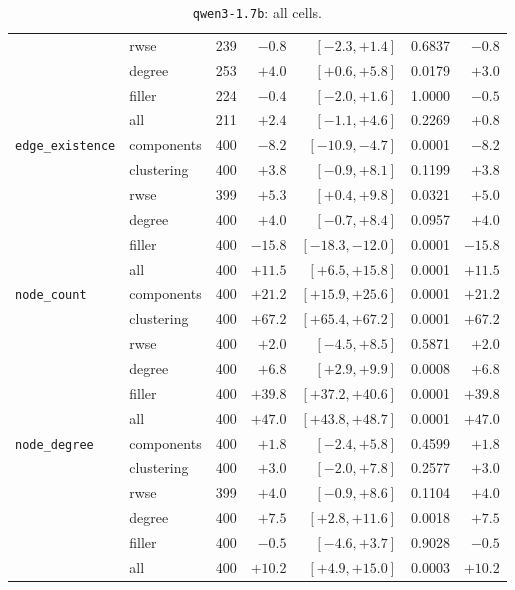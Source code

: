 \begin{table}[H]
{\begin{tabular}{llrrrrr}
 & rwse & 239 & $-0.8$ & $[-2.3, +1.4]$ & 0.6837 & $-0.8$ \\
 & degree & 253 & $+4.0$ & $[+0.6, +5.8]$ & 0.0179 & $+3.0$ \\
 & filler & 224 & $-0.4$ & $[-2.0, +1.6]$ & 1.0000 & $-0.5$ \\
 & all & 211 & $+2.4$ & $[-1.1, +4.6]$ & 0.2269 & $+0.8$ \\
\midrule
\texttt{edge\_existence} & components & 400 & $-8.2$ & $[-10.9, -4.7]$ & 0.0001 & $-8.2$ \\
 & clustering & 400 & $+3.8$ & $[-0.9, +8.1]$ & 0.1199 & $+3.8$ \\
 & rwse & 399 & $+5.3$ & $[+0.4, +9.8]$ & 0.0321 & $+5.0$ \\
 & degree & 400 & $+4.0$ & $[-0.7, +8.4]$ & 0.0957 & $+4.0$ \\
 & filler & 400 & $-15.8$ & $[-18.3, -12.0]$ & 0.0001 & $-15.8$ \\
 & all & 400 & $+11.5$ & $[+6.5, +15.8]$ & 0.0001 & $+11.5$ \\
\midrule
\texttt{node\_count} & components & 400 & $+21.2$ & $[+15.9, +25.6]$ & 0.0001 & $+21.2$ \\
 & clustering & 400 & $+67.2$ & $[+65.4, +67.2]$ & 0.0001 & $+67.2$ \\
 & rwse & 400 & $+2.0$ & $[-4.5, +8.5]$ & 0.5871 & $+2.0$ \\
 & degree & 400 & $+6.8$ & $[+2.9, +9.9]$ & 0.0008 & $+6.8$ \\
 & filler & 400 & $+39.8$ & $[+37.2, +40.6]$ & 0.0001 & $+39.8$ \\
 & all & 400 & $+47.0$ & $[+43.8, +48.7]$ & 0.0001 & $+47.0$ \\
\midrule
\texttt{node\_degree} & components & 400 & $+1.8$ & $[-2.4, +5.8]$ & 0.4599 & $+1.8$ \\
 & clustering & 400 & $+3.0$ & $[-2.0, +7.8]$ & 0.2577 & $+3.0$ \\
 & rwse & 399 & $+4.0$ & $[-0.9, +8.6]$ & 0.1104 & $+4.0$ \\
 & degree & 400 & $+7.5$ & $[+2.8, +11.6]$ & 0.0018 & $+7.5$ \\
 & filler & 400 & $-0.5$ & $[-4.6, +3.7]$ & 0.9028 & $-0.5$ \\
 & all & 400 & $+10.2$ & $[+4.9, +15.0]$ & 0.0003 & $+10.2$ \\
\bottomrule
\end{tabular}}
\caption{\texttt{qwen3-1.7b}: all cells.}
\end{table}

